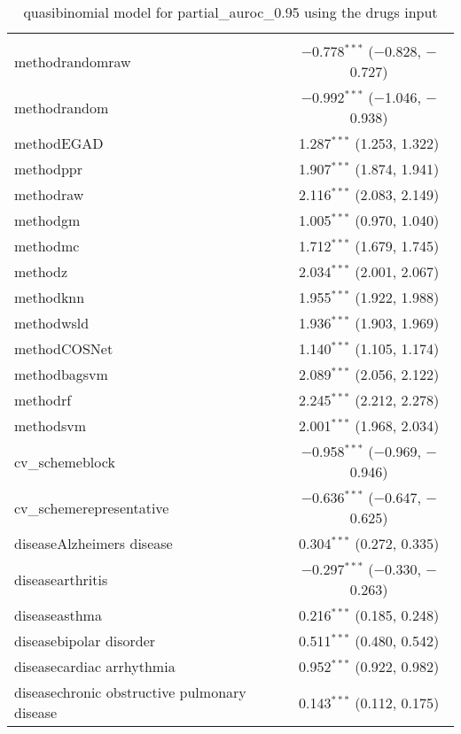 
\begin{table}[!htbp] \centering 
  \caption{quasibinomial model for partial_auroc_0.95 using the drugs input} 
  \label{} 
\begin{tabular}{@{\extracolsep{5pt}}lc} 
\\[-1.8ex]\hline 
\hline \\[-1.8ex] 
 methodrandomraw & $-$0.778$^{***}$ ($-$0.828, $-$0.727) \\ 
  methodrandom & $-$0.992$^{***}$ ($-$1.046, $-$0.938) \\ 
  methodEGAD & 1.287$^{***}$ (1.253, 1.322) \\ 
  methodppr & 1.907$^{***}$ (1.874, 1.941) \\ 
  methodraw & 2.116$^{***}$ (2.083, 2.149) \\ 
  methodgm & 1.005$^{***}$ (0.970, 1.040) \\ 
  methodmc & 1.712$^{***}$ (1.679, 1.745) \\ 
  methodz & 2.034$^{***}$ (2.001, 2.067) \\ 
  methodknn & 1.955$^{***}$ (1.922, 1.988) \\ 
  methodwsld & 1.936$^{***}$ (1.903, 1.969) \\ 
  methodCOSNet & 1.140$^{***}$ (1.105, 1.174) \\ 
  methodbagsvm & 2.089$^{***}$ (2.056, 2.122) \\ 
  methodrf & 2.245$^{***}$ (2.212, 2.278) \\ 
  methodsvm & 2.001$^{***}$ (1.968, 2.034) \\ 
  cv\_schemeblock & $-$0.958$^{***}$ ($-$0.969, $-$0.946) \\ 
  cv\_schemerepresentative & $-$0.636$^{***}$ ($-$0.647, $-$0.625) \\ 
  diseaseAlzheimers disease & 0.304$^{***}$ (0.272, 0.335) \\ 
  diseasearthritis & $-$0.297$^{***}$ ($-$0.330, $-$0.263) \\ 
  diseaseasthma & 0.216$^{***}$ (0.185, 0.248) \\ 
  diseasebipolar disorder & 0.511$^{***}$ (0.480, 0.542) \\ 
  diseasecardiac arrhythmia & 0.952$^{***}$ (0.922, 0.982) \\ 
  diseasechronic obstructive pulmonary disease & 0.143$^{***}$ (0.112, 0.175) \\ 

\end{tabular}
\end{table}
